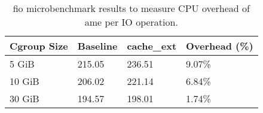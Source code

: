 \begin{table}
\centering
\caption{fio microbenchmark results to measure CPU overhead of 
ame per IO operation.}
\label{tab:eval-cpu-overhead}
\begin{tabular}{llll}
\toprule
Cgroup Size & Baseline & cache\_ext & Overhead (\%) \\
\midrule
      5 GiB &   215.05 &    236.51 &        9.07\% \\
     10 GiB &   206.02 &    221.14 &        6.84\% \\
     30 GiB &   194.57 &    198.01 &        1.74\% \\
\bottomrule
\end{tabular}
\end{table}
